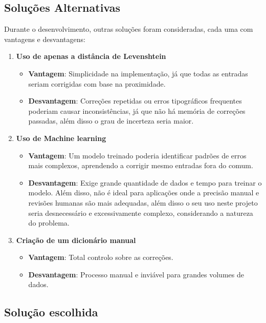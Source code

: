 \documentclass[a4paper,12pt]{article}
\begin{document}
\subsection{Soluções Alternativas}

Durante o desenvolvimento, outras soluções foram consideradas, cada uma com vantagens e desvantagens:

\begin{enumerate}
    \item \textbf{Uso de apenas a distância de Levenshtein}  
    \begin{itemize}
        \item \textbf{Vantagem}: Simplicidade na implementação, já que todas as entradas seriam corrigidas com base na proximidade.
        \item \textbf{Desvantagem}: Correções repetidas ou erros tipográficos frequentes poderiam causar inconsistências, já que não há memória de correções passadas, além disso o grau de incerteza seria maior.
    \end{itemize}
    
    \item \textbf{Uso de Machine learning}  
    \begin{itemize}
        \item \textbf{Vantagem}: Um modelo treinado poderia identificar padrões de erros mais complexos, aprendendo a corrigir mesmo entradas fora do comum.
        \item \textbf{Desvantagem}: Exige grande quantidade de dados e tempo para treinar o modelo. Além disso, não é ideal para aplicações onde a precisão manual e revisões humanas são mais adequadas, além disso o seu uso neste projeto seria desnecessário e excessivamente complexo, considerando a natureza do problema.
    \end{itemize}
    
    \item \textbf{Criação de um dicionário manual}  
    \begin{itemize}
        \item \textbf{Vantagem}: Total controlo sobre as correções.
        \item \textbf{Desvantagem}: Processo manual e inviável para grandes volumes de dados.
    \end{itemize}
\end{enumerate}

\subsection{Solução escolhida}
\end{document}
